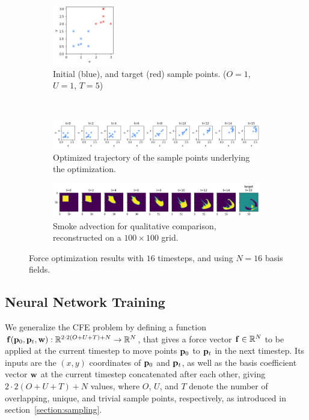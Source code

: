 \begin{figure}
  \centering
  \begin{subfigure}{\textwidth}
    \centering
    \includegraphics[width=0.3\textwidth]{figures/f-optim/blue_start_red_target.png}
    \caption{Initial (blue), and target (red) sample points. ($O=1$, $U=1$,
    $T=5$)}
  \end{subfigure}\\
  \begin{subfigure}{\textwidth}
    \centering
    \includegraphics[width=\textwidth]{figures/f-optim/trajectory_horizontal.png}
    \caption{Optimized trajectory of the sample points underlying the
    optimization.}
  \end{subfigure}\par\medskip
  \begin{subfigure}{\textwidth}
    \centering
    \includegraphics[width=\textwidth]{figures/f-optim/smoke_trajectory_horizontal.png}
    \caption{Smoke advection for qualitative comparison, reconstructed on
    a $100\times 100$ grid.}
  \end{subfigure}\par\medskip
  \caption{Force optimization results with $16$ timesteps, and using $N=16$
  basis fields.}
  \label{fig:f_optim}
\end{figure}

\pagebreak
{}
\subsection{Neural Network Training}\label{section:nn-training}
We generalize the \acf{CFE} problem by defining a function
$\vb{f}(\vb{p}_0,\vb{p}_t,\vb{w}): \mathbb{R}^{2\cdot2(O+U+T)+N}\to
\mathbb{R}^N$, that gives a force vector $\vb{f} \in \mathbb{R}^N$ to be
applied at the current timestep to move points $\vb{p}_0$ to $\vb{p}_t$ in the
next timestep. Its inputs are the $(x,y)$ coordinates of $\vb{p}_0$ and
$\vb{p}_t$, as well as the basis coefficient vector $\vb{w}$ at the current
timestep concatenated after each other, giving $2\cdot2(O+U+T)+N$ values, where
$O$, $U$, and $T$ denote the number of overlapping, unique, and trivial sample
points, respectively, as introduced in section~\ref{section:sampling}.

